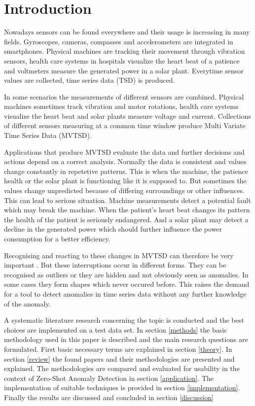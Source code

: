 \section{Introduction}\label{intro}
Nowadays sensors can be found everywhere and their usage is increasing in many fields. Gyroscopes, cameras, compasses and accelerometers are integrated in smartphones. Physical machines are tracking their movement through vibration sensors, health care systems in hospitals visualize the heart beat of a patience and voltmeters measure the generated power in a solar plant. Everytime sensor values are collected, time series data (TSD) is produced.

In some scenarios the measurements of different sensors are combined. Physical machines sometimes track vibration and motor rotations, health care systems visualize the heart beat and solar plants measure voltage and current.
Collections of different sensors measuring at a common time window produce Multi Variate Time Series Data (MVTSD).

Applications that produce MVTSD evaluate the data and further decisions and actions depend on a correct analysis.
Normally the data is consistent and values change constantly in repetetive patterns. This is when the machine, the patience health or the solar plant is functioning like it is supposed to. But sometimes the values change unpredicted because of differing surroundings or other influences. This can lead to serious situation. Machine measurements detect a potential fault which may break the machine. When the patient's heart beat changes its pattern the health of the patient is seriously endangered. And a solar plant may detect a decline in the generated power which should further influence the power consumption for a better efficiency.

Recognising and reacting to these changes in MVTSD can therefore be very important%
. But these interruptions occur in different forms. They can be recognised as outliers or they are hidden and not obviously seen as anomalies. In some cases they form shapes which never occured before. This raises the demand for a tool to detect anomalies in time series data without any further knowledge of the anomaly.


A systematic literature research concerning the topic is conducted and the best choices are implemented on a test data set. In section \ref{methods} the basic methodology used in this paper is described and the main research questions are formulated. First basic necessary terms are explained in section \ref{theory}. In section \ref{review} the found papers and their methodologies are presented and explained. The methodologies are compared and evaluated for usability in the context of Zero-Shot Anomaly Detection in section \ref{application}. The implementation of suitable techniques is provided in section \ref{implementation}. Finally the results are discussed and concluded in section \ref{discussion}
